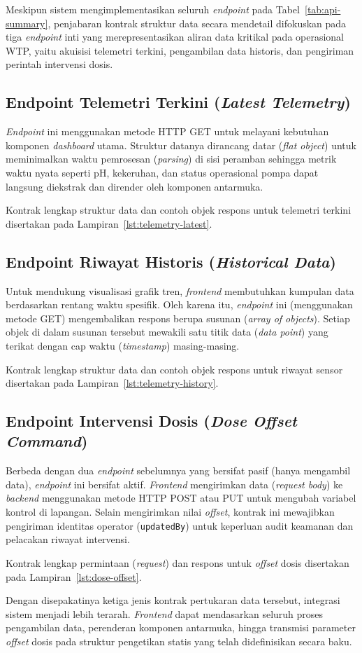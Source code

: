 Meskipun sistem mengimplementasikan seluruh \textit{endpoint} pada Tabel~\ref{tab:api-summary}, 
penjabaran kontrak struktur data secara mendetail difokuskan pada tiga \textit{endpoint} inti yang 
merepresentasikan aliran data kritikal pada operasional WTP, yaitu akuisisi telemetri terkini, pengambilan 
data historis, dan pengiriman perintah intervensi dosis.

\subsection{Endpoint Telemetri Terkini (\textit{Latest Telemetry})}
\textit{Endpoint} ini menggunakan metode HTTP GET untuk melayani kebutuhan komponen \textit{dashboard} utama. 
Struktur datanya dirancang datar (\textit{flat object}) untuk meminimalkan waktu pemrosesan (\textit{parsing}) 
di sisi peramban sehingga metrik waktu nyata seperti pH, kekeruhan, dan status operasional pompa dapat langsung 
diekstrak dan dirender oleh komponen antarmuka.

Kontrak lengkap struktur data dan contoh objek respons untuk telemetri terkini disertakan pada Lampiran~\ref{lst:telemetry-latest}.

\subsection{Endpoint Riwayat Historis (\textit{Historical Data})}
Untuk mendukung visualisasi grafik tren, \textit{frontend} membutuhkan kumpulan data berdasarkan rentang 
waktu spesifik. Oleh karena itu, \textit{endpoint} ini (menggunakan metode GET) mengembalikan respons berupa 
susunan (\textit{array of objects}). Setiap objek di dalam susunan tersebut mewakili satu titik data (\textit{data point}) 
yang terikat dengan cap waktu (\textit{timestamp}) masing-masing.

Kontrak lengkap struktur data dan contoh objek respons untuk riwayat sensor disertakan pada Lampiran~\ref{lst:telemetry-history}.

\subsection{Endpoint Intervensi Dosis (\textit{Dose Offset Command})}
Berbeda dengan dua \textit{endpoint} sebelumnya yang bersifat pasif (hanya mengambil data), \textit{endpoint} 
ini bersifat aktif. \textit{Frontend} mengirimkan data (\textit{request body}) ke \textit{backend} menggunakan 
metode HTTP POST atau PUT untuk mengubah variabel kontrol di lapangan. Selain mengirimkan nilai \textit{offset}, 
kontrak ini mewajibkan pengiriman identitas operator (\texttt{updatedBy}) untuk keperluan audit keamanan dan 
pelacakan riwayat intervensi.

Kontrak lengkap permintaan (\textit{request}) dan respons untuk \textit{offset} dosis disertakan pada Lampiran~\ref{lst:dose-offset}.

Dengan disepakatinya ketiga jenis kontrak pertukaran data tersebut, integrasi sistem menjadi lebih terarah. \textit{Frontend} 
dapat mendasarkan seluruh proses pengambilan data, perenderan komponen antarmuka, hingga transmisi parameter 
\textit{offset} dosis pada struktur pengetikan statis yang telah didefinisikan secara baku.